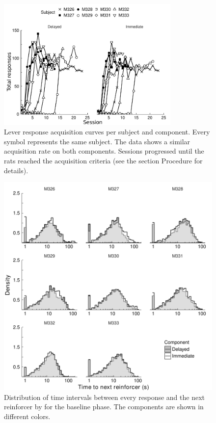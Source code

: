 \documentclass{article}
\begin{document}
\begin{figure}[ht]
	\centering
	\includegraphics[width=0.8\textwidth]{SM_figure_2.pdf}
	\caption{Lever response acquisition curves per subject and component. Every symbol represents the same subject. The data shows a similar acquisition rate on both components. Sessions progressed until the rats reached the acquisition criteria (see the section Procedure for details).}
\end{figure}

\begin{figure}[ht]
	\centering
	\includegraphics[width=\textwidth]{SM_figure_3.pdf}
	\caption{Distribution of time intervals between every response and the next reinforcer by for the baseline phase. The components are shown in different colors.}
\end{figure}
	
\end{document}
